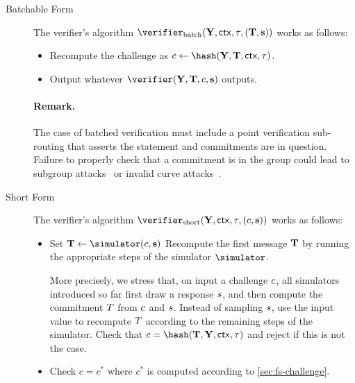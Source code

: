 \documentclass[runningheads,11pt]{article}
\begin{document}
\begin{description}
  \item[Batchable Form]
      The verifier's algorithm $\batchverifier(\vec \statement, \ctx, \stag, (\vec \commitment,\vec s))$ works as follows:
      \begin{itemize}
        \item
          Recompute the challenge as $\challenge\gets\hash(\vec \statement, \vec \commitment, \ctx, \stag)$.
        \item
          Output whatever $\verifier(\vec \statement,\vec \commitment,\challenge,\vec \response)$ outputs.
      \end{itemize}
      \paragraph{Remark.}
The case of batched verification must include a point verification sub-routing that asserts the statement and commitments are in question. Failure to properly check that a commitment is in the group could lead to subgroup attacks~\cite{EC:VanWie96,C:LimLee97} or invalid curve attacks~\cite{C:BieMeyMul00,RSA:BBPV12}.
  \item[Short Form]
      The verifier's algorithm $\shortverifier(\vec \statement, \ctx, \stag, (\challenge, \vec \response))$ works as follows:
      \begin{itemize}
        \item Set $\vec \commitment \gets \simulator(\challenge, \vec \response)$
         Recompute the first message $\mathbf {T}$ by running the appropriate steps of the simulator $\simulator$.

    More precisely, we stress that, on input a challenge $c$, all simulators introduced so far first draw a response $s$, and then compute the commitment $T$ from $c$ and $s$.
       Instead of sampling $s$, use the input value to recompute $T$ according to the remaining steps of the simulator.
        Check that $\challenge=\hash(\vec \commitment, \vec \statement, \ctx, \tau)$ and reject if this is not the case.
        \item Check $c = c^*$ where $c^*$ is computed according to \cref{sec:fs-challenge}.
      \end{itemize}
\end{description}
\end{document}

